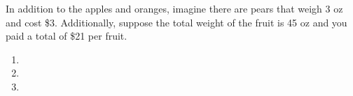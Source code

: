 In addition to the apples and oranges, imagine there are pears that weigh 3 oz and cost \$3. Additionally, suppose the total weight of the fruit is 45 oz and you paid a total of \$21 per fruit.

\begin{enumerate}
    \item 
    \item 
    \item 
\end{enumerate}